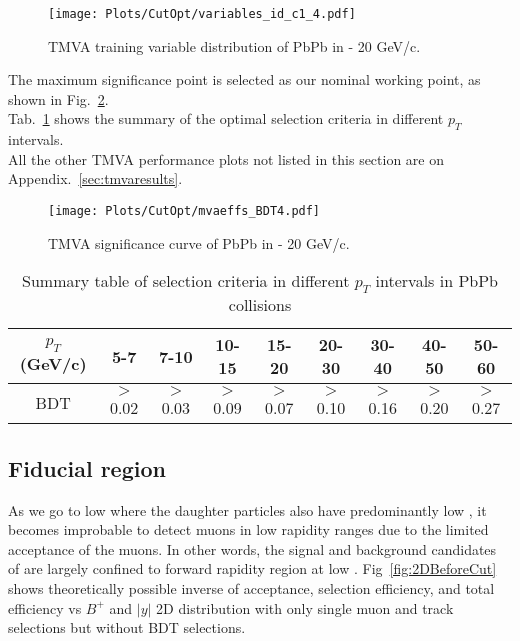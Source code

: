 \begin{figure}[h]
\begin{center}
\texttt{[image: Plots/CutOpt/variables\_id\_c1\_4.pdf]}
\caption{TMVA training variable distribution of PbPb in  - 20 GeV/c.}
\label{fig:tmvaPbPbvar4}
\end{center}
\end{figure}

\clearpage
The maximum significance point is selected as our nominal working point, as shown in Fig.~\ref{fig:tmvaPbPbsig4}. \\
Tab.~\ref{tab:cutoptPbPb} shows the summary of the optimal selection criteria in different $p_{T}$ intervals. \\
All the other TMVA performance plots not listed in this section are on Appendix.~\ref{sec:tmvaresults}. \\

\begin{figure}[h]
\begin{center}
\texttt{[image: Plots/CutOpt/mvaeffs\_BDT4.pdf]}
\caption{TMVA significance curve of PbPb in  - 20 GeV/c.}
\label{fig:tmvaPbPbsig4}
\end{center}
\end{figure}

\begin{table}[h]
\centering
\begin{tabular}{|c|c|c|c|c|c|c|c|c|}
\hline
\textbf{$p_{T}$ (GeV/c)} & \textbf{5-7} & \textbf{7-10} & \textbf{10-15} & \textbf{15-20} & \textbf{20-30} & \textbf{30-40} & \textbf{40-50} & \textbf{50-60} \\
\hline
BDT & $>$0.02 & $>$0.03 & $>$0.09 & $>$0.07 & $>$0.10 & $>$0.16 & $>$0.20 & $>$0.27 \\
\hline
\end{tabular}
\caption{Summary table of selection criteria in different $p_{T}$ intervals in PbPb collisions}
\label{tab:cutoptPbPb}
\end{table}

\clearpage

\subsection{Fiducial region}
As we go to low \Bplus \pt where the daughter particles also have predominantly low \pt, it becomes improbable to detect muons in low rapidity ranges due to the limited acceptance of the muons. In other words, the signal and background candidates of \Bplus are largely confined to forward rapidity region at low \Bplus \pt. Fig~\ref{fig:2DBeforeCut} shows theoretically possible inverse of acceptance, selection efficiency, and total efficiency vs $B^{+}$ \pt and $|y|$ 2D distribution with only single muon and track selections but without BDT selections. 

